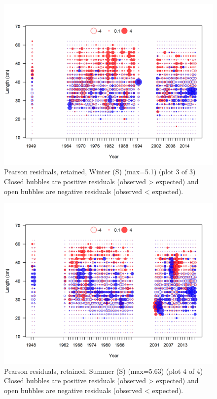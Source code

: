 \documentclass[12pt,]{article}
\begin{document}
\begin{figure}
\centering
\includegraphics{r4ss/plots_mod1/comp_lenfit_residsflt3mkt2_page3.png}
\caption{Pearson residuals, retained, Winter (S) (max=5.1) (plot 3 of
3)\\
Closed bubbles are positive residuals (observed \textgreater{} expected)
and open bubbles are negative residuals (observed \textless{} expected).
\label{fig:ws_len_pearson}}
\end{figure}

\begin{figure}
\centering
\includegraphics{r4ss/plots_mod1/comp_lenfit_residsflt4mkt2_page4.png}
\caption{Pearson residuals, retained, Summer (S) (max=5.63) (plot 4 of
4)\\
Closed bubbles are positive residuals (observed \textgreater{} expected)
and open bubbles are negative residuals (observed \textless{} expected).
\label{fig:ss_len_pearson}}
\end{figure}
\end{document}
